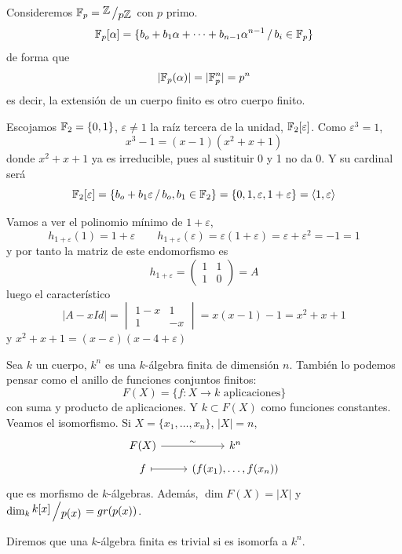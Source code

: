     \begin{ejem}
        Consideremos $\bb F_p = \modulo{\bb Z}{ p \bb Z}$ con $p$ primo.
        $$\mathbb{F}_p [ \alpha] = \{b_o + b_1 \alpha + \cdots  + b_{n-1} \alpha^{n-1} \, /\, b_i \in \mathbb{F}_p\}$$
        de forma que 
        $$|\mathbb{F}_p(\alpha)| = |\mathbb{F}_p^n| = p^n$$
        es decir, la extensi\'on de un cuerpo finito es otro cuerpo finito. 
    \end{ejem}
    \begin{ejem}
        Escojamos $\mathbb{F}_2 = \{0,1\}$, $\varepsilon\neq 1$ la ra\'iz tercera de la unidad,
        $\mathbb{F}_2[\varepsilon]$. Como $\varepsilon^3 = 1$,
        $$x^3-1 = (x-1)(x^2+x+1)$$ 
        donde $x^2+x+1$ ya es irreducible, pues al sustituir 0 y 1 no da 0. Y su cardinal ser\'a $$\mathbb{F}_2[\varepsilon] = \{b_o + b_1\varepsilon \, / \, b_o , b_1 \in \mathbb{F}_2\} = \{0,1,\varepsilon, 1+\varepsilon\}=\langle 1, \varepsilon\rangle$$ 

        Vamos a ver el polinomio m\'inimo de $1+\varepsilon$, 
        $$h_{1+\varepsilon}(1)= 1 + \varepsilon \qquad h_{1+\varepsilon}(\varepsilon) = \varepsilon(1+\varepsilon) = \varepsilon + \varepsilon^2 = -1 = 1$$
        y por tanto la matriz de este endomorfismo es
        $$h_{1+\varepsilon} = \begin{pmatrix}
            1 & 1 \\ 1 & 0
        \end{pmatrix} = A$$
        luego el caracter\'istico
        $$|A-xId| = \begin{vmatrix}
            1-x & 1 \\ 1 & -x
        \end{vmatrix} = x(x-1)-1 = x^2+x+1$$
        y $x^2+x+1 = (x-\varepsilon)(x-4+\varepsilon)$
    \end{ejem}
    \begin{ejem}
        Sea $k$ un cuerpo, $k^n$ es una $k$-\'algebra finita de dimensi\'on $n$. Tambi\'en lo podemos pensar como el anillo de funciones conjuntos finitos: 
        $$F(X) = \{f: X \longrightarrow k \text{ aplicaciones}\}$$
        con suma y producto de aplicaciones. Y $k \subset F(X)$ como funciones constantes. Veamos el isomorfismo. Si $X = \{x_1, \ldots, x_n\}, \, |X| = n$, 
        $$\bt F(X) \rar{\sim} & k^n \\[-5mm] f \rarmaps & (f(x_1), \ldots, f(x_n)) \et$$
        que es morfismo de $k$-\'algebras. Adem\'as, $\dim F(X) = |X|$ y $\dim_k \modulo{k[x]}{p(x)} = gr(p(x))$. 
    \end{ejem}
    \begin{defi}
        Diremos que una $k$-\'algebra finita es trivial si es isomorfa a $k^n$. 
    \end{defi}

